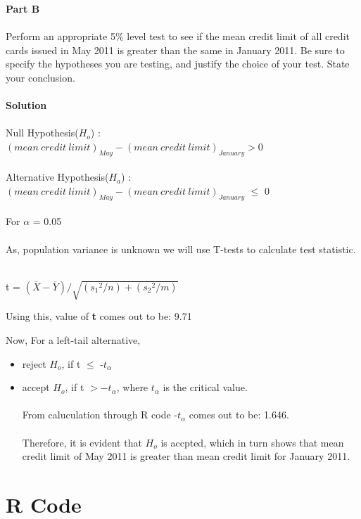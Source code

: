 \documentclass[12pt,a4paper]{report}
\begin{document}
\textbf{Part B}
\\\\
Perform an appropriate 5\% level test to see if the mean credit limit of all credit cards issued in May 2011 is greater than the same in January 2011. Be sure to specify the hypotheses you are testing, and
justify the choice of your test. State your conclusion.
\\\\
\textbf{Solution}
\\\\
Null Hypothesis($H_o$) : $(mean\ credit\ limit)_{May} - (mean\ credit\ limit)_{January} > 0$\\\\
Alternative Hypothesis($H_a$) : $(mean\ credit\ limit)_{May} - (mean\ credit\ limit)_{January}$ $\leq$ 0\\\\
For $\alpha$ = 0.05\\\\
As, population variance is unknown we will use T-tests to calculate test statistic.\\\\
\begin{center}
t = $(\overline{X}-\overline{Y})/\sqrt{({s_1}^2/n)+({s_2}^2/m)}$
\end{center}
Using this, value of \textbf{t} comes out to be: 9.71

Now, For a left-tail alternative,
\begin{itemize}
\item reject $H_o$, if t $\leq$ -$t_\alpha$
\item accept $H_o$, if t $> -t_\alpha$, where $t_\alpha$ is the critical value.\\\\
From caluculation through R code -$t_\alpha$ comes out to be: 1.646.\\\\
Therefore, it is evident that $H_o$ is accpted, which in turn shows that mean credit limit of May 2011 is greater than mean credit limit for January 2011.
\end{itemize}
\newpage
\section{R Code}
\end{document}
